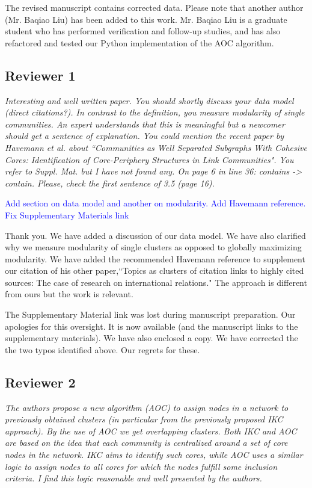 \documentclass[11pt, oneside]{article}   	%
\begin{document}
\noindent The revised manuscript contains corrected data. Please note that another author (Mr. Baqiao Liu) has been added to this work. Mr. Baqiao Liu is a graduate student who has performed verification and follow-up studies, and 
has also refactored and tested our Python implementation of the AOC algorithm.


\subsection*{Reviewer 1} \emph{Interesting and well written paper. You should shortly discuss your data model (direct citations?). In contrast to the definition, you measure modularity of single communities. An expert understands that this is meaningful but a newcomer should get a sentence of explanation.  You could mention the recent paper by Havemann et al. about ``Communities as Well Separated Subgraphs With Cohesive Cores: Identification of Core-Periphery Structures in Link Communities". You refer to Suppl. Mat. but I have not found any. On page 6 in line 36: contains -> contain. Please, check the first sentence of 3.5 (page 16).}

\textcolor{blue}{Add section on data model and another on modularity. Add Havemann reference. Fix Supplementary Materials link}

\vspace{4 mm}
Thank you. We have added a discussion of our data model. We have also clarified why we measure modularity of single clusters as opposed to globally maximizing modularity. We have added the recommended 
Havemann reference to supplement our citation of his other paper,``Topics as clusters of citation links to highly cited sources: The case of research on international relations." The approach is different from 
ours but the work is relevant.

The Supplementary Material link was lost during manuscript preparation. Our apologies for this oversight. It is now available (and the manuscript links to the supplementary materials). We have also enclosed a copy. We have corrected the the two typos identified
above. Our regrets for these.

\clearpage

\subsection*{Reviewer 2} \emph{The authors propose a new algorithm (AOC) to assign nodes in a network to previously obtained clusters (in particular from the previously proposed IKC approach). By the use of AOC we get overlapping clusters. Both IKC and AOC are based on the idea that each community is centralized around a set of core nodes in the network. IKC aims to identify such cores, while AOC uses a similar logic to assign nodes to all cores for which the nodes fulfill some inclusion criteria. I find this logic reasonable and well presented by the authors.} 
\end{document}
